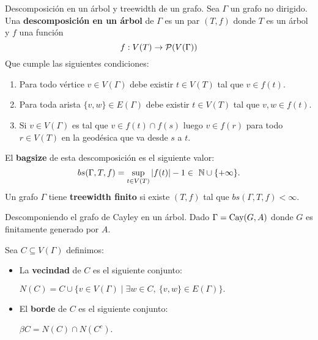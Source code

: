 \documentclass[aspectratio=169, 11pt]{beamer}
\begin{document}
	

	\begin{frame}{Descomposición en un árbol y treewidth de un grafo.}
	Sea $\Gamma$ un grafo no dirigido.
	Una \textbf{descomposición en un árbol} de $\Gamma$ es un par $(T,f)$ donde
	$T$ es un árbol y $f$ una función 
	\[
	f: V(T) \to {\cal{P}}(V(\Gamma))
	\]
	Que cumple las siguientes condiciones:
	\begin{enumerate}
		\item Para todo vértice $v \in V(\Gamma)$ debe existir $t \in V(T)$ tal que $v \in f(t)$. 
		\item Para toda arista $\{v,w\} \in E(\Gamma)$ 
		debe existir $t \in V(T)$ tal que $v,w \in f(t)$.
		\item Si $v \in V(\Gamma)$ es tal que $v \in f(t) \cap f(s)$ luego $v \in f(r)$ para todo $r \in V(T)$ en la geodésica que va desde $s$ a $t$.  
	\end{enumerate}
	El \textbf{bagsize} de esta descomposición es el siguiente valor:
	\begin{equation*}
		bs(\Gamma,T,f) = \sup_{t \in V(T)} |f(t)| - 1 \in \  \mathbb{N} \cup \{ +\infty \}.
	\end{equation*}
	Un grafo $\Gamma$ tiene \textbf{treewidth finito} si existe $(T,f)$ tal que $bs(\Gamma,T,f) < \infty$.
	\end{frame}
	
	\begin{frame}[fragile]{Descomponiendo el grafo de Cayley en un árbol.}
		Dado $\Gamma = \text{Cay}(G, A)$ donde $G$ es finitamente generado por $A$.

		Sea $C \subseteq V(\Gamma)$ definimos:
		\begin{itemize}
			\item  
				La \textbf{vecindad} de $C$ es el siguiente conjunto:

				$N(C) = C \cup \{ v \in V(\Gamma) \mid \exists w \in C, \ \{v,w \} \in E(\Gamma) \}.$

			\item 
				El \textbf{borde} de $C$ es el siguiente conjunto: 

				$\beta C =  N(C) \cap N(C^{c})$.
		\end{itemize} 
	\end{frame}
\end{document}
